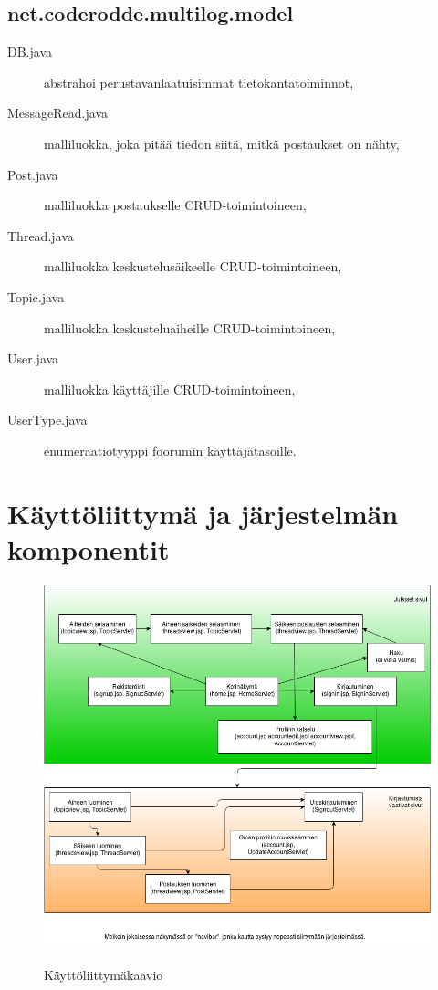 \documentclass[10pt]{article}
\begin{document}
\subsection{net.coderodde.multilog.model}
\begin{description}
  \item[DB.java] abstrahoi perustavanlaatuisimmat tietokantatoiminnot,
  \item[MessageRead.java] malliluokka, joka pitää tiedon siitä, mitkä postaukset on nähty,
  \item[Post.java] malliluokka postaukselle CRUD-toimintoineen,
  \item[Thread.java] malliluokka keskustelusäikeelle CRUD-toimintoineen,
  \item[Topic.java] malliluokka keskusteluaiheille CRUD-toimintoineen,
  \item[User.java] malliluokka käyttäjille CRUD-toimintoineen,
  \item[UserType.java] enumeraatiotyyppi foorumin käyttäjätasoille.
\end{description}

\section{Käyttöliittymä ja järjestelmän komponentit}

\begin{figure}[H]
  \caption{Käyttöliittymäkaavio}
  \centering
  \includegraphics[width=\textwidth, keepaspectratio]{ViewDiagram}
  \label{fig:viewdiagram}
\end{figure}
\end{document}
